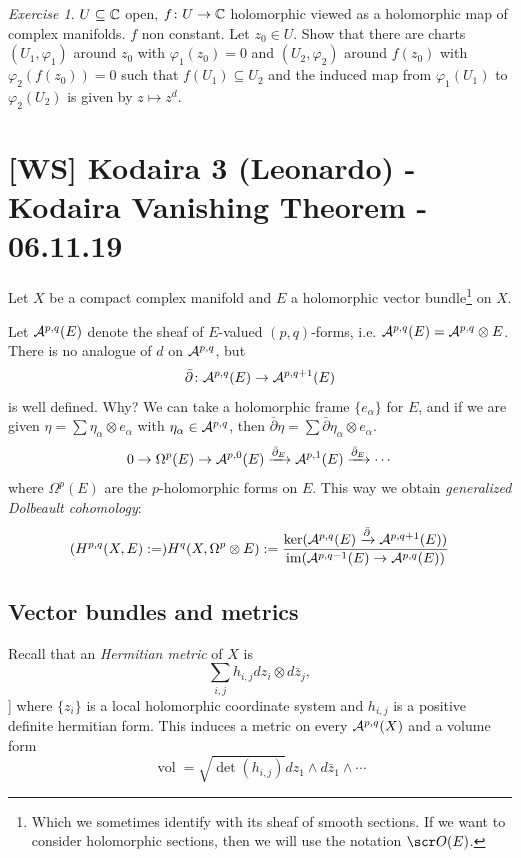 \documentclass[A4paper, british, reqno]{amsart}
\theoremstyle{darkgreentheorem}
\theoremstyle{darkbluedefinition}
\theoremstyle{darkredexample}
\theoremstyle{remark}
\newtheorem{exe}[thm]{Exercise}
\DeclareMathOperator{\im}{im}
\DeclareMathOperator{\vol}{vol}
\newcommand{\1}{\mathbbm{1}}
\newcommand{\ot}{\otimes}
\newcommand{\sub}{\subseteq}
\begin{document}
\begin{exe}
    $U\sub\C$ open, $f\colon U\to \mathbb{C}$ holomorphic viewed as a holomorphic map of complex manifolds.
    $f$ non constant.
    Let $z_{0}\in U$.
    Show that there are charts $(U_{1},\varphi_{1})$ around $z_{0}$ with $\varphi_{1}(z_{0})=0$ and $(U_{2},\varphi_{2})$ around $f(z_{0})$ with $\varphi_{2}(f(z_{0}))=0$ such that $f(U_{1})\sub U_{2}$ and the induced map from $\varphi_{1}(U_{1})$ to $\varphi_{2}(U_{2})$ is given by $z\mapsto z^{d}$.
\end{exe}

\section{[WS] Kodaira 3 (Leonardo) - Kodaira Vanishing Theorem - 06.11.19}

Let $X$ be a compact complex manifold and $E$ a holomorphic vector bundle\footnote{Which we sometimes identify with its sheaf of smooth sections. If we want to consider holomorphic sections, then we will use the notation $\O(E)$.} on $X$.

Let $\mathcal{A}^{p,q}(E)$ denote the sheaf of $E$-valued $(p,q)$-forms, i.e. $\calA^{p,q}(E)=\calA^{p,q}\ot E$.
There is no analogue of $d$ on $\mathcal{A}^{p,q}$, but
\[ \bar{\partial }\colon \mathcal{A}^{p,q}(E)\to \mathcal{A}^{p,q+1}(E) \]
is well defined.
Why?
We can take a holomorphic frame $\{ e_{\alpha}\}$ for $E$, and if we are given $\eta=\sum \eta_{\alpha}\ot e_{\alpha}$ with $\eta_{\alpha}\in \mathcal{A}^{p,q}$, then $\bar{\partial }\eta=\sum\bar{\partial}\eta_{\alpha}\ot e_{\alpha}$.
\[ 0\to \Omega^{p}(E)\to \mathcal{A}^{p,0}(E)\xrightarrow{\bar{\partial}_{E}} \mathcal{A}^{p,1}(E)\xrightarrow{\bar{\partial}_{E}}\cdots \]
where $\Omega^{p}(E)$ are the $p$-holomorphic forms on $E$.
This way we obtain \textit{generalized Dolbeault cohomology}:
\[ (H^{p,q}(X,E):=)H^{q}(X,\Omega^{p}\ot E):=\frac{\ker(\calA^{p,q}(E)\xrightarrow{\bar{\partial}}\calA^{p,q+1}(E))}{\im(\calA^{p,q-1}(E)\to \calA^{p,q}(E))} \]

\subsection{Vector bundles and metrics}

Recall that an \textit{Hermitian metric} of $X$ is
\[ \sum_{i,j}h_{i,j}dz_{i}\ot d\bar{z}_{j},\]]
where $\{z_{i}\}$ is a local holomorphic coordinate system and $h_{i,j}$ is a positive definite hermitian form.
This induces a metric on every $\mathcal{A}^{p,q}(X)$ and a volume form
\[ \vol=\sqrt{\det(h_{i,j})}dz_{1}\wedge d\bar{z}_{1}\wedge \cdots \]
\end{document}

